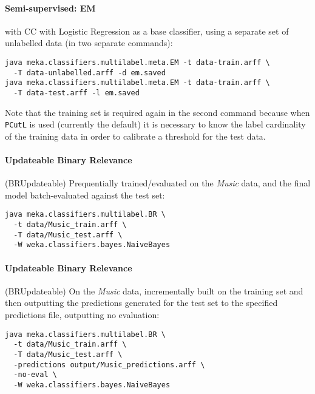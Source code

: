 \documentclass[11pt]{article}
\begin{document}
\paragraph{Semi-supervised: EM} with CC with Logistic Regression as a base classifier, using a separate set of unlabelled data (in two separate commands):
\begin{lstlisting}
java meka.classifiers.multilabel.meta.EM -t data-train.arff \
  -T data-unlabelled.arff -d em.saved
java meka.classifiers.multilabel.meta.EM -t data-train.arff \
  -T data-test.arff -l em.saved
\end{lstlisting}

Note that the training set is required again in the second command because when \texttt{PCutL} is used (currently the default) it is necessary to know the label cardinality of the training data in order to calibrate a threshold for the test data.

\paragraph{Updateable Binary Relevance} (BRUpdateable) Prequentially trained/evaluated on the \textit{Music} data, and the final model batch-evaluated against the test set:
\begin{lstlisting}
java meka.classifiers.multilabel.BR \
  -t data/Music_train.arff \
  -T data/Music_test.arff \
  -W weka.classifiers.bayes.NaiveBayes
\end{lstlisting}

\paragraph{Updateable Binary Relevance} (BRUpdateable) On the \textit{Music} data, incrementally built on the training set and then outputting the predictions generated for the test set to the specified predictions file, outputting no evaluation:
\begin{lstlisting}
java meka.classifiers.multilabel.BR \
  -t data/Music_train.arff \
  -T data/Music_test.arff \
  -predictions output/Music_predictions.arff \
  -no-eval \
  -W weka.classifiers.bayes.NaiveBayes
\end{lstlisting}
\end{document}

